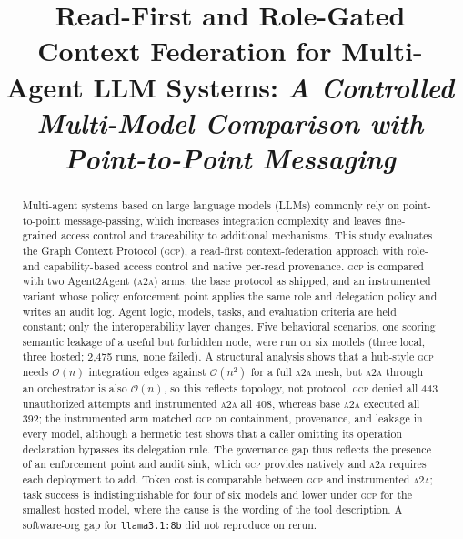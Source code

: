 \documentclass[conference,letterpaper]{IEEEtran}
\newcommand{\gcp}{\textsc{gcp}}
\newcommand{\ata}{\textsc{a2a}}
\newcommand{\bigoh}{\mathcal{O}}
\begin{document}
\title{Read-First and Role-Gated Context Federation for Multi-Agent LLM
Systems: \textit{A Controlled Multi-Model Comparison with Point-to-Point
Messaging}}

\author{
}

\maketitle

\begin{abstract}
Multi-agent systems based on large language models (LLMs) commonly rely on point-to-point
message-passing, which increases integration complexity and leaves fine-grained access control and
traceability to additional mechanisms. This study evaluates the Graph Context Protocol (\gcp{}), a
read-first context-federation approach with role- and capability-based access control and native
per-read provenance. \gcp{} is compared with two Agent2Agent (\ata{}) arms: the base protocol as
shipped, and an instrumented variant whose policy enforcement point applies the same role and
delegation policy and writes an audit log. Agent logic, models, tasks, and evaluation criteria are
held constant; only the interoperability layer changes. Five behavioral scenarios, one scoring
semantic leakage of a useful but forbidden node, were run on six models (three local, three hosted;
2{,}475 runs, none failed). A structural analysis shows that a hub-style \gcp{} needs
$\bigoh(n)$ integration edges against $\bigoh(n^2)$ for a full \ata{} mesh, but \ata{} through an
orchestrator is also $\bigoh(n)$, so this reflects topology, not protocol. \gcp{} denied all 443
unauthorized attempts and instrumented \ata{} all 408, whereas base \ata{} executed all 392; the
instrumented arm matched \gcp{} on containment, provenance, and leakage in every model, although a
hermetic test shows that a caller omitting its operation declaration bypasses its delegation rule. The
governance gap thus reflects the presence of an enforcement point and audit sink, which \gcp{}
provides natively and \ata{} requires each deployment to add. Token cost is comparable between
\gcp{} and instrumented \ata{}; task success is indistinguishable for four of six models and lower
under \gcp{} for the smallest hosted model, where the cause is the wording of the tool description.
A software-org gap for \texttt{llama3.1:8b} did not reproduce on rerun.
\end{abstract}
\end{document}
